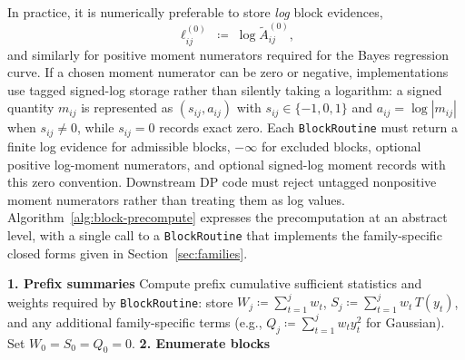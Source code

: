 In practice, it is numerically preferable to store \emph{log} block evidences,
\begin{equation}
    \ell_{i j}^{(0)} \;\coloneqq\; \log \widetilde{A}^{(0)}_{i j},
\end{equation}
and similarly for positive moment numerators required for the Bayes regression curve. If a chosen
moment numerator can be zero or negative, implementations use tagged signed-log storage rather than
silently taking a logarithm: a signed quantity $m_{ij}$ is represented as $(s_{ij},a_{ij})$ with
$s_{ij}\in\{-1,0,1\}$ and $a_{ij}=\log |m_{ij}|$ when $s_{ij}\ne0$, while $s_{ij}=0$ records exact
zero. Each \texttt{BlockRoutine} must return a finite log evidence
for admissible blocks, $-\infty$ for excluded blocks, optional positive log-moment numerators, and
optional signed-log moment records with this zero convention. Downstream DP code must reject
untagged nonpositive moment numerators rather than treating them as log values. Algorithm~\ref{alg:block-precompute} expresses the precomputation at an abstract level, with a
single call to a \texttt{BlockRoutine} that implements the family-specific closed forms given in
Section~\ref{sec:families}.

\begin{algorithm}[H]
\caption{PrecomputeBlocks$(y,x,w,\texttt{BlockRoutine})$}
\label{alg:block-precompute}
\BlankLine
\textbf{1. Prefix summaries}\;
Compute prefix cumulative sufficient statistics and weights required by \texttt{BlockRoutine}:
store $W_j\coloneqq\sum_{t=1}^j w_t$, $S_j\coloneqq\sum_{t=1}^j w_t\,T(y_t)$, and any additional
family-specific terms (e.g., $Q_j\coloneqq\sum_{t=1}^j w_t y_t^2$ for Gaussian). Set $W_0=S_0=Q_0=0$.
\BlankLine
\textbf{2. Enumerate blocks}\;
\end{algorithm}

